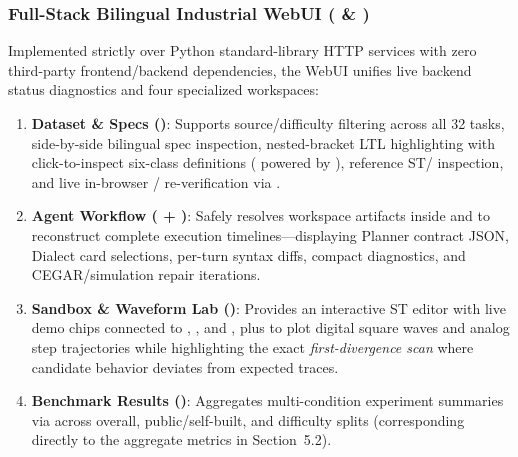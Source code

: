 \subsubsection{Full-Stack Bilingual Industrial WebUI ( \& )}
Implemented strictly over Python standard-library HTTP services with zero third-party frontend/backend dependencies, the WebUI unifies live backend status diagnostics and four specialized workspaces:
\begin{enumerate}
  \item \textbf{Dataset \& Specs ()}: Supports source/difficulty filtering across all 32 tasks, side-by-side bilingual spec inspection, nested-bracket LTL highlighting with click-to-inspect six-class definitions ( powered by ), reference ST/ inspection, and live in-browser / re-verification via .
  \item \textbf{Agent Workflow ( + )}: Safely resolves workspace artifacts inside  and  to reconstruct complete execution timelines---displaying Planner contract JSON, Dialect card selections, per-turn  syntax diffs, compact diagnostics, and CEGAR/simulation repair iterations.
  \item \textbf{Sandbox \& Waveform Lab ()}: Provides an interactive ST editor with live demo chips connected to , , and , plus  to plot digital square waves and analog step trajectories while highlighting the exact \emph{first-divergence scan} where candidate behavior deviates from expected traces.
  \item \textbf{Benchmark Results ()}: Aggregates multi-condition experiment summaries via  across overall, public/self-built, and difficulty splits (corresponding directly to the aggregate metrics in Section~5.2).
\end{enumerate}
